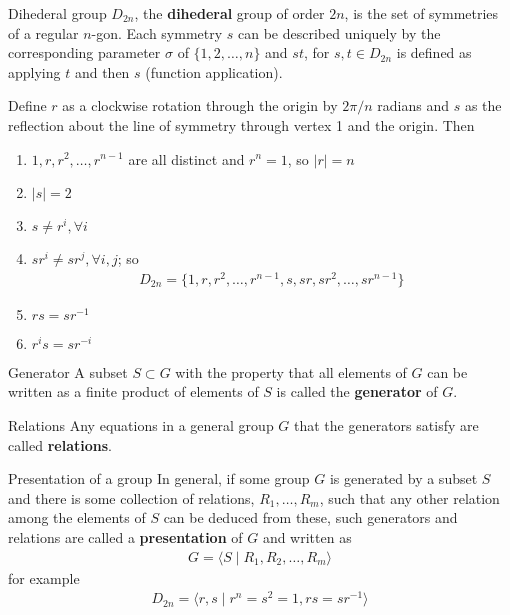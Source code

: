 \documentclass[titlepage, 12pt]{article}
\begin{document}
\begin{definition}{Dihederal group}{}
    $D_{2n}$, the \textbf{dihederal} group of order $2n$, is the set of
    symmetries of a regular $n$-gon. Each symmetry $s$ can be described uniquely
    by the corresponding parameter $\sigma$ of $\{1,2,\dots,n\}$ and $st$, for
    $s, t\in D_{2n}$ is defined as applying $t$ and then $s$ (function
    application).

    Define $r$ as a clockwise rotation through the origin by $2\pi/n$ radians
    and $s$ as the reflection about the line of symmetry through vertex 1 and
    the origin. Then

  \begin{enumerate}
      \item $1,r,r^2,\dots,r^{n-1}$ are all distinct and $r^n=1$, so $|r| = n$

      \item $|s| = 2$

      \item $s\neq r^i,\forall i$

      \item $sr^i\neq sr^j, \forall i, j$; so
        \begin{gather*}
          D_{2n} = \{1,r,r^2,\dots,r^{n-1},s,sr,sr^2,\dots,sr^{n-1}\}
        \end{gather*}

      \item $rs=sr^{-1}$

      \item $r^is=sr^{-i}$
  \end{enumerate}

\end{definition}

\begin{definition}{Generator}{}
  A subset $S\subset G$ with the property that all elements of $G$ can be
    written as a finite product of elements of $S$ is called the
    \textbf{generator} of $G$.
\end{definition}

\begin{definition}{Relations}{}
  Any equations in a general group $G$ that the generators satisfy are
    called \textbf{relations}.
\end{definition}

\begin{definition}{Presentation of a group}{}
  In general, if some group $G$ is generated by a subset $S$ and there is
    some collection of relations, $R_1,\dots,R_m$, such that any other relation
    among the elements of $S$ can be deduced from these, such generators and
    relations are called a \textbf{presentation} of $G$ and written as
    \begin{gather*}
      G = \langle S\mid R_1, R_2,\dots, R_m\rangle
    \end{gather*}
    for example
    \begin{gather*}
      D_{2n} = \langle r, s\mid r^n = s^2 = 1, rs = sr^{-1}\rangle
    \end{gather*}
\end{definition}
\end{document}
